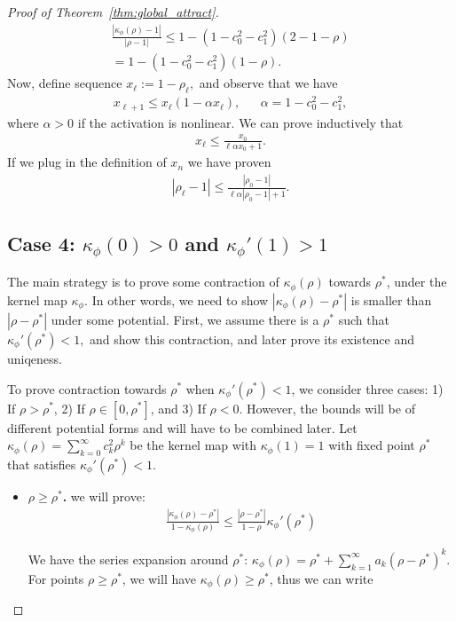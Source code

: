 \documentclass[twoside]{article}
\newcommand{\km}{\kappa_\phi}
\theoremstyle{definition}
\begin{document}
\begin{proof}[Proof of Theorem~\ref{thm:global_attract}]
\begin{align*}
    \frac{|\km(\rho)-1|}{|\rho-1|} \le 1-(1-c_0^2-c_1^2)(2-1-\rho) \\
    = 1- (1-c_0^2-c_1^2) (1-\rho).
\end{align*}
Now, define sequence $x_\ell:= 1-\rho_\ell,$ and observe that we have 
\begin{align*}
    x_{\ell+1} \le x_\ell (1-\alpha x_\ell), && \alpha = 1-c_0^2-c_1^2,
\end{align*}
where $\alpha > 0$ if the activation is nonlinear. 
We can prove inductively that 
\begin{align*}
x_\ell\le \frac{x_0}{\ell\alpha x_0 + 1}.
\end{align*}
If we plug in the definition of $x_n$ we have proven
\begin{align*}
|\rho_\ell-1| \le \frac{|\rho_0-1|}{\ell \alpha |\rho_0-1| + 1}.
\end{align*}

\subsection*{Case 4: $\km(0)>0$ and $\km'(1)>1$}
The main strategy is to prove some contraction of $\km(\rho)$ towards $\rho^*$, under the kernel map $\km$. In other words, we need to show $|\km(\rho)-\rho^*|$ is smaller than $|\rho-\rho^*|$ under some potential. First, we assume there is a $\rho^*$ such that $\km'(\rho^*)<1,$ and show this contraction, and later prove its existence and uniqeness. 

To prove contraction towards $\rho^*$ when $\km'(\rho^*)<1$, we consider three cases: 1) If $\rho > \rho^*$, 2) If $\rho \in [0,\rho^*]$, and 3) If $\rho < 0$. However, the bounds will be of different potential forms and will have to be combined later. Let $\km(\rho) = \sum_{k=0}^\infty c_k^2 \rho^k$ be the kernel map with $\km(1)= 1$ with fixed point $\rho^*$ that satisfies $\km'(\rho^*)<1.$

\begin{itemize}
\item \textbf{$\rho\ge \rho^*$.} we will prove:
\begin{align*}
\frac{|\km(\rho)-\rho^*|}{1-\km(\rho)} \le \frac{|\rho-\rho^*|}{1-\rho} \km'(\rho^*)
\end{align*}

We have the series expansion around $\rho^*$: $\km(\rho) = \rho^* + \sum_{k=1}^\infty a_k (\rho-\rho^*)^k$. For points $\rho\ge \rho^*$, we will have $\km(\rho)\ge \rho^*$, thus we can write


\end{itemize}
\end{proof}
\end{document}
